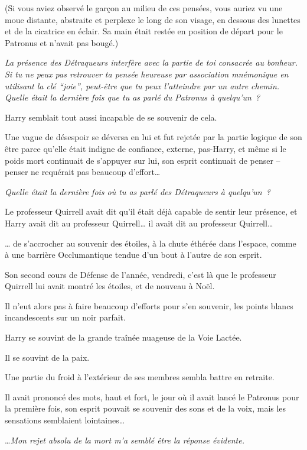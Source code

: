 (Si vous aviez observé le garçon au milieu de ces pensées, vous auriez vu une moue distante, abstraite et perplexe le long de son visage, en dessous des lunettes et de la cicatrice en éclair.
Sa main était restée en position de départ pour le Patronus et n'avait pas bougé.)

\emph{La présence des Détraqueurs interfère avec la partie de toi consacrée au bonheur.
Si tu ne peux pas retrouver ta pensée heureuse par association mnémonique en utilisant la clé “joie”, peut-être que tu peux l'atteindre par un autre chemin.
Quelle était la dernière fois que tu as parlé du Patronus à quelqu'un~?}

Harry semblait tout aussi incapable de se souvenir de cela.

Une vague de désespoir se déversa en lui et fut rejetée par la partie logique de son être parce qu'elle était indigne de confiance, externe, pas-Harry, et même si le poids mort continuait de s'appuyer sur lui, son esprit continuait de penser -- penser ne requérait pas beaucoup d'effort…

\emph{Quelle était la dernière fois où tu as parlé des Détraqueurs à quelqu'un~?}

Le professeur Quirrell avait dit qu'il était déjà capable de sentir leur présence, et Harry avait dit au professeur Quirrell… il avait dit au professeur Quirrell…

… de s'accrocher au souvenir des étoiles, à la chute éthérée dans l'espace, comme à une barrière Occlumantique tendue d'un bout à l'autre de son esprit.

Son second cours de Défense de l'année, vendredi, c'est là que le professeur Quirrell lui avait montré les étoiles, et de nouveau à Noël.

Il n'eut alors pas à faire beaucoup d'efforts pour s'en souvenir, les points blancs incandescents sur un noir parfait.

Harry se souvint de la grande traînée nuageuse de la Voie Lactée.

Il se souvint de la paix.

Une partie du froid à l'extérieur de ses membres sembla battre en retraite.

Il avait prononcé des mots, haut et fort, le jour où il avait lancé le Patronus pour la première fois, son esprit pouvait se souvenir des sons et de la voix, mais les sensations semblaient lointaines…

…\emph{Mon rejet absolu de la mort m'a semblé être la réponse évidente.}

